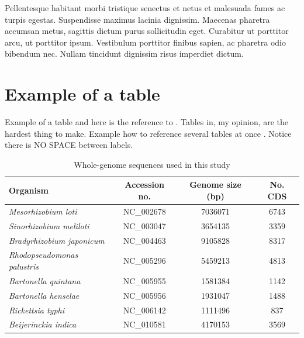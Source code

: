 Pellentesque habitant morbi tristique senectus et netus et malesuada fames ac turpis egestas. Suspendisse maximus lacinia dignissim. Maecenas pharetra accumsan metus, sagittis dictum purus sollicitudin eget. Curabitur ut porttitor arcu, ut porttitor ipsum. Vestibulum porttitor finibus sapien, ac pharetra odio bibendum nec. Nullam tincidunt dignissim risus imperdiet dictum.
\section{Example of a table}
Example of a table and here is the reference to . Tables in, my opinion, are the hardest thing to make. Example how to reference several tables at once . Notice there is NO SPACE between labels.

\begin{table}
\begin{center}
\begin{tabular}{|l|c|c|c|}
\hline
{\sc Organism}  &  {\sc Accession no.}  & {\sc Genome size} (bp)  & {\sc No. CDS} \\
\hline
{\it Mesorhizobium loti}          & NC\_002678 & 7036071 & 6743 \\
\hline
{\it Sinorhizobium meliloti}      & NC\_003047 & 3654135 & 3359 \\
\hline
{\it Bradyrhizobium japonicum}    & NC\_004463 & 9105828 & 8317 \\
\hline
{\it Rhodopseudomonas palustris}  & NC\_005296 & 5459213 & 4813 \\
\hline
{\it Bartonella quintana}         & NC\_005955 & 1581384 & 1142 \\
\hline
{\it Bartonella henselae}         & NC\_005956 & 1931047 & 1488 \\
\hline
{\it Rickettsia typhi}            & NC\_006142 & 1111496 & 837 \\
\hline
{\it Beijerinckia indica}         & NC\_010581 & 4170153 & 3569 \\
\hline
\end{tabular}
\end{center}
\caption{Whole-genome sequences used in this study}
\label{table_genomes}
\end{table}

